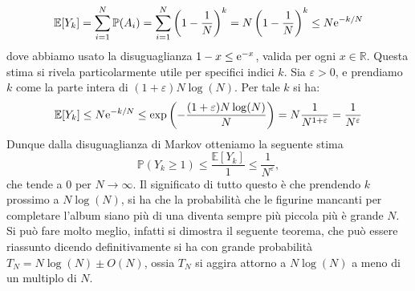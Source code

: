 \documentclass[11pt]{book}
\theoremstyle{Definizione}
\theoremstyle{TeoremaProposizioneLemmaCorollario}
\theoremstyle{OsservazioneNota}
\newcommand{\R}{\mathbb{R}}
\renewcommand{\P}{\mathbb{P}}
\newcommand{\e}{\textup{e}}
\newcommand{\E}{\mathbb{E}}
\begin{document}
\begin{equation}\label{eq:StimaValorMedioY_k}
\E[Y_k] = \sum_{i = 1}^N \P(A_i) = \sum_{i = 1}^N \left(1-\frac{1}{N}\right)^k = N\left(1-\frac{1}{N}\right)^k \leq N \e^{-k/N}
\end{equation}
dove abbiamo usato la disuguaglianza $1-x \leq \e^{-x}$, valida per ogni $x\in \R$. Questa stima si rivela particolarmente utile per specifici indici $k$. Sia $\varepsilon > 0$, e prendiamo $k$ come la parte intera di $(1+\varepsilon)N \log(N)$. Per tale $k$ si ha:
$$
\E[Y_k] \leq N \e^{-k/N} \leq \exp\left(-\frac{(1+\varepsilon)N\log(N)}{N}\right) = N\frac{1}{N^{1+\varepsilon}} = \frac{1}{N^\varepsilon}
$$
Dunque dalla disuguaglianza di Markov otteniamo la seguente stima
$$
\P(Y_k \geq 1) \leq \frac{\E[Y_k]}{1}\leq \frac{1}{N^\varepsilon},
$$
che tende a $0$ per $N \to \infty$. Il significato di tutto questo è che prendendo $k$ prossimo a $N\log(N)$, si ha che la probabilità che le figurine mancanti per completare l'album siano più di una diventa sempre più piccola più è grande $N$.\\
Si può fare molto meglio, infatti si dimostra il seguente teorema, che può essere riassunto dicendo definitivamente si ha con grande probabilità $T_N = N\log(N) \pm O(N)$, ossia $T_N$ si aggira attorno a $N\log(N)$ a meno di un multiplo di $N$.
\end{document}

